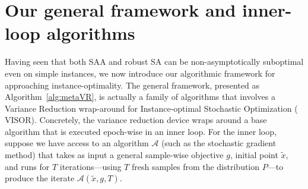\documentclass[11pt,twoside]{article}
\numberwithin{equation}{section}
\newcommand{\1}{\mathbf{1}}
\theoremstyle{remark}
\theoremstyle{plain}
\newcommand{\algname}{\mathrm{VISOR}}
\begin{document}
\section{Our general framework and inner-loop algorithms}\label{sec:better_algorithm}

Having seen that both SAA and robust SA can be non-asymptotically suboptimal even on simple instances, we now introduce our algorithmic framework for approaching instance-optimality. The general framework, presented as Algorithm~\ref{alg:metaVR}, is actually a family of algorithms that involves a Variance Reduction wrap-around for Instance-optimal Stochastic Optimization ($\algname$). Concretely, the variance reduction device wraps around a base algorithm that is executed epoch-wise in an inner loop. For the inner loop, suppose we have access to an algorithm $\mathcal{A}$ (such as the stochastic gradient method) that takes as input a general sample-wise objective $g$, initial point $\widetilde{x}$, and runs for $T$ iterations---using $T$ fresh samples from the distribution $P$---to produce the iterate $\mathcal{A}(\widetilde{x}, g, T)$.
\end{document}
